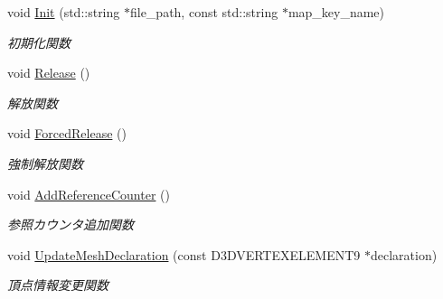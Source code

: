 \begin{DoxyCompactItemize}
void \mbox{\hyperlink{class_model_x_object_a9d731de11568871fb5002cc9d5099a75}{Init}} (std\+::string $\ast$file\+\_\+path, const std\+::string $\ast$map\+\_\+key\+\_\+name)
\begin{DoxyCompactList}\small\item\em 初期化関数 \end{DoxyCompactList}\item 
void \mbox{\hyperlink{class_model_x_object_a01e988c50849c048915b957667cb80f1}{Release}} ()
\begin{DoxyCompactList}\small\item\em 解放関数 \end{DoxyCompactList}\item 
void \mbox{\hyperlink{class_model_x_object_a6035084c786294b69a76e34724504eb5}{Forced\+Release}} ()
\begin{DoxyCompactList}\small\item\em 強制解放関数 \end{DoxyCompactList}\item 
void \mbox{\hyperlink{class_model_x_object_a6329bb0953ff48bb440b0142dc64dd64}{Add\+Reference\+Counter}} ()
\begin{DoxyCompactList}\small\item\em 参照カウンタ追加関数 \end{DoxyCompactList}\item 
void \mbox{\hyperlink{class_model_x_object_a9ec21b2d9f541bcb80fe61257bbd8722}{Update\+Mesh\+Declaration}} (const D3\+D\+V\+E\+R\+T\+E\+X\+E\+L\+E\+M\+E\+N\+T9 $\ast$declaration)
\begin{DoxyCompactList}\small\item\em 頂点情報変更関数 \end{DoxyCompactList}\end{DoxyCompactItemize}
